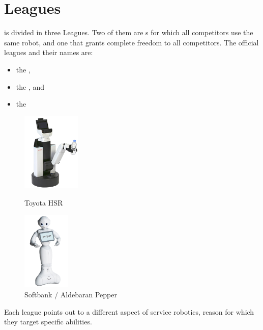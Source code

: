 \section{Leagues}
\label{sec:leagues}

 is divided in three Leagues. Two of them are s for which all competitors use the same robot, and one that grants complete freedom to all competitors. The official leagues and their names are:
\begin{itemize}
  \item the ,
  \item the , and
  \item the 
\end{itemize}

\begin{figure}
	\vspace{-30pt}
	\begin{center}
		\includegraphics[width=0.25\textwidth]{images/toyota_hsr.png}
		\vspace{-10pt}
		\caption{Toyota HSR}
		\label{fig:toyotaHSR}
	\end{center}

	\vspace{-25pt}
	\begin{center}
		\includegraphics[width=0.20\textwidth]{images/softbank_pepper.png}
		\vspace{-10pt}
		\caption{Softbank / Aldebaran Pepper}
		\label{fig:softbank-pepper}
	\end{center}
\end{figure}
Each league points out to a different aspect of service robotics, reason for which they target specific abilities.


